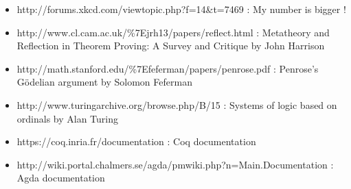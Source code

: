 \documentclass[10pt]{article}
\begin{document}
\begin{itemize}
\item http://forums.xkcd.com/viewtopic.php?f=14\&t=7469 : 
My number is bigger !

\item http://www.cl.cam.ac.uk/\%7Ejrh13/papers/reflect.html : 
Metatheory and Reflection in Theorem Proving: A Survey and Critique by John Harrison

\item http://math.stanford.edu/\%7Efeferman/papers/penrose.pdf : 
Penrose's Gödelian argument by Solomon Feferman

\item http://www.turingarchive.org/browse.php/B/15 : 
Systems of logic based on ordinals by Alan Turing

\item https://coq.inria.fr/documentation : 
Coq documentation

\item http://wiki.portal.chalmers.se/agda/pmwiki.php?n=Main.Documentation : 
Agda documentation

\end{itemize}
\end{document}
